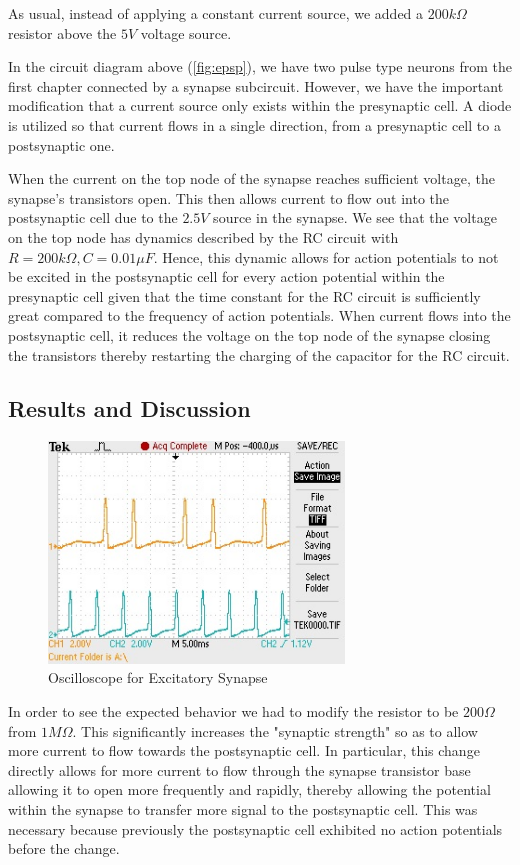 \documentclass[12]{book}
\newcommand\0{\mathbf{0}}
\newcommand\<{\langle}
\renewcommand\>{\rangle}
\begin{document}
As usual, instead of applying a constant current source, we added a $200k\Omega$ resistor above the $5V$ voltage source.

In the circuit diagram above (\ref{fig:epsp}), we have two pulse type neurons from the first chapter connected by a synapse subcircuit. However, we have the important modification that a current source only exists within the presynaptic cell. A diode is utilized so that current flows in a single direction, from a presynaptic cell to a postsynaptic one.  

When the current on the top node of the synapse reaches sufficient voltage, the synapse's transistors open. This then allows current to flow out into the postsynaptic cell due to the $2.5V$ source in the synapse. We see that the voltage on the top node has dynamics described by the RC circuit with $R=200 k \Omega, C = 0.01 \mu F$. Hence, this dynamic allows for action potentials to not be excited in the postsynaptic cell for every action potential within the presynaptic cell given that the time constant for the RC circuit is sufficiently great compared to the frequency of action potentials. When current flows into the postsynaptic cell, it reduces the voltage on the top node of the synapse closing the transistors thereby restarting the charging of the capacitor for the RC circuit.

\subsection{Results and Discussion}

\begin{figure}[h]
\centering
\includegraphics[width=0.7\textwidth]{excitatory.jpg}
\caption{Oscilloscope for Excitatory Synapse}
\end{figure}

In order to see the expected behavior we had to modify the resistor to be $200 \Omega$ from $1 M \Omega$. This significantly increases the "synaptic strength" so as to allow more current to flow towards the postsynaptic cell. In particular, this change directly allows for more current to flow through the synapse transistor base allowing it to open more frequently and rapidly, thereby allowing the potential within the synapse to transfer more signal to the postsynaptic cell. This was necessary because previously the postsynaptic cell exhibited no action potentials before the change.
\end{document}
